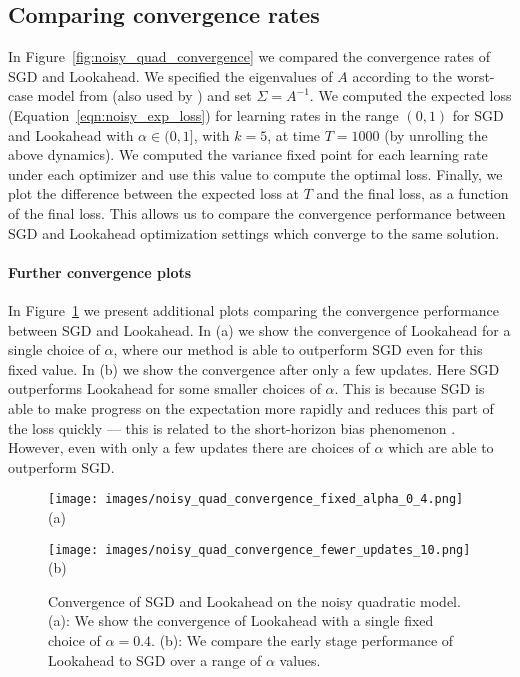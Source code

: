 \documentclass{article}
\begin{document}
\subsection{Comparing convergence rates} In Figure~\ref{fig:noisy_quad_convergence} we compared the convergence rates of SGD and Lookahead. We specified the eigenvalues of $A$ according to the worst-case model from \citet{li2005sharpness} (also used by \citet{wu2018understanding}) and set $\Sigma = A^{-1}$. We computed the expected loss (Equation~\ref{eqn:noisy_exp_loss}) for learning rates in the range $(0,1)$ for SGD and Lookahead with $\alpha \in (0,1]$, with $k=5$, at time $T=1000$ (by unrolling the above dynamics). We computed the variance fixed point for each learning rate under each optimizer and use this value to compute the optimal loss. Finally, we plot the difference between the expected loss at $T$ and the final loss, as a function of the final loss. This allows us to compare the convergence performance between SGD and Lookahead optimization settings which converge to the same solution.

\paragraph{Further convergence plots} In Figure~\ref{fig:noisy_quad_more_convergence} we present additional plots comparing the convergence performance between SGD and Lookahead. In (a) we show the convergence of Lookahead for a single choice of $\alpha$, where our method is able to outperform SGD even for this fixed value. In (b) we show the convergence after only a few updates. Here SGD outperforms Lookahead for some smaller choices of $\alpha$.  This is because SGD is able to make progress on the expectation more rapidly and reduces this part of the loss quickly --- this is related to the short-horizon bias phenomenon \citep{wu2018understanding}. However, even with only a few updates there are choices of $\alpha$ which are able to outperform SGD.

\begin{figure}
    \begin{minipage}{.5\textwidth}
    \centering
    \texttt{[image: images/noisy\_quad\_convergence\_fixed\_alpha\_0\_4.png]}\\(a)
    \end{minipage}    \begin{minipage}{.5\textwidth}
    \centering
    \texttt{[image: images/noisy\_quad\_convergence\_fewer\_updates\_10.png]}\\(b)
    \end{minipage}
    \caption{Convergence of SGD and Lookahead on the noisy quadratic model. (a): We show the convergence of Lookahead with a single fixed choice of $\alpha=0.4$. (b): We compare the early stage performance of Lookahead to SGD over a range of $\alpha$ values. }
    \label{fig:noisy_quad_more_convergence}
\end{figure}
\end{document}
